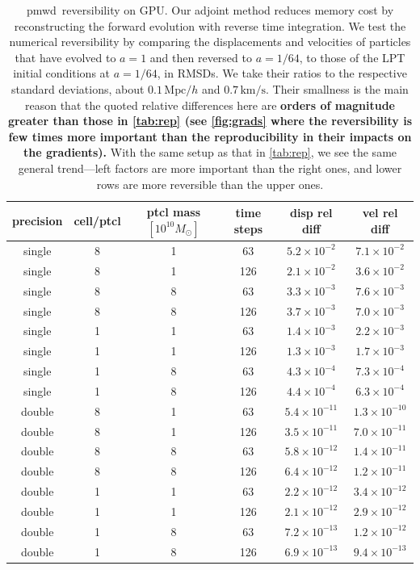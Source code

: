 \documentclass[modern, dvipsnames]{aastex631}
\newcommand{\pmwd}{{\usefont{T1}{nova}{m}{sl}pmwd}}
\newcommand{\Mpc}{\mathrm{Mpc}}
\newcommand{\HL}[1]{\textcolor{Bittersweet}{\textbf{#1}}}
\begin{document}
\begin{table}[t]
\centering
\caption{\pmwd\ reversibility on GPU.
Our adjoint method reduces memory cost by reconstructing the forward
evolution with reverse time integration.
We test the numerical reversibility by comparing the displacements and
velocities of particles that have evolved to $a=1$ and then reversed to
$a=1/64$, to those of the LPT initial conditions at $a=1/64$, in RMSDs.
We take their ratios to the respective standard deviations, about $0.1
\, \Mpc / h$ and $0.7 \, \mathrm{km} / \mathrm{s}$.
Their smallness is the main reason that the quoted relative differences
here are \HL{orders of magnitude greater than those in \autoref{tab:rep}
(see \autoref{fig:grads} where the reversibility is few times more
important than the reproducibility in their impacts on the gradients).}
With the same setup as that in \autoref{tab:rep}, we see the same
general trend---left factors are more important than the right ones,
and lower rows are more reversible than the upper ones.
}
\label{tab:rev}
\begin{tabular}{cccccc}
  \toprule
  precision & cell/ptcl & ptcl mass $[10^{10} M_\odot]$ & time steps
    & disp rel diff & vel rel diff \\
  \midrule
  single & 8 & 1 &  63 & $5.2\times10^{-2}$  & $7.1\times10^{-2}$  \\
  single & 8 & 1 & 126 & $2.1\times10^{-2}$  & $3.6\times10^{-2}$  \\
  single & 8 & 8 &  63 & $3.3\times10^{-3}$  & $7.6\times10^{-3}$  \\
  single & 8 & 8 & 126 & $3.7\times10^{-3}$  & $7.0\times10^{-3}$  \\
  single & 1 & 1 &  63 & $1.4\times10^{-3}$  & $2.2\times10^{-3}$  \\
  single & 1 & 1 & 126 & $1.3\times10^{-3}$  & $1.7\times10^{-3}$  \\
  single & 1 & 8 &  63 & $4.3\times10^{-4}$  & $7.3\times10^{-4}$  \\
  single & 1 & 8 & 126 & $4.4\times10^{-4}$  & $6.3\times10^{-4}$  \\
  double & 8 & 1 &  63 & $5.4\times10^{-11}$ & $1.3\times10^{-10}$ \\
  double & 8 & 1 & 126 & $3.5\times10^{-11}$ & $7.0\times10^{-11}$ \\
  double & 8 & 8 &  63 & $5.8\times10^{-12}$ & $1.4\times10^{-11}$ \\
  double & 8 & 8 & 126 & $6.4\times10^{-12}$ & $1.2\times10^{-11}$ \\
  double & 1 & 1 &  63 & $2.2\times10^{-12}$ & $3.4\times10^{-12}$ \\
  double & 1 & 1 & 126 & $2.1\times10^{-12}$ & $2.9\times10^{-12}$ \\
  double & 1 & 8 &  63 & $7.2\times10^{-13}$ & $1.2\times10^{-12}$ \\
  double & 1 & 8 & 126 & $6.9\times10^{-13}$ & $9.4\times10^{-13}$ \\
  \bottomrule
\end{tabular}
\end{table}
\end{document}
